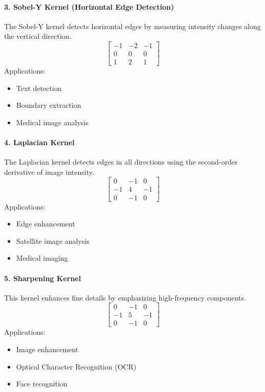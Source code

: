 \documentclass[11pt]{article}
\begin{document}
\vspace{3mm}
\paragraph{3. Sobel-Y Kernel (Horizontal Edge Detection)}
The Sobel-Y kernel detects horizontal edges by measuring intensity changes along the vertical direction.
\[
\begin{bmatrix} -1 & -2 & -1 \\ 0 & 0 & 0 \\ 1 & 2 & 1 \end{bmatrix}
\]
Applications:
\begin{itemize}
\item Text detection
\item Boundary extraction
\item Medical image analysis
\end{itemize}

\vspace{3mm}
\paragraph{4. Laplacian Kernel}
The Laplacian kernel detects edges in all directions using the second-order derivative of image intensity.
\[
\begin{bmatrix} 0 & -1 & 0 \\ -1 & 4 & -1 \\ 0 & -1 & 0 \end{bmatrix}
\]
Applications:
\begin{itemize}
\item Edge enhancement
\item Satellite image analysis
\item Medical imaging
\end{itemize}

\vspace{3mm}
\paragraph{5. Sharpening Kernel}
This kernel enhances fine details by emphasizing high-frequency components.
\[
\begin{bmatrix} 0 & -1 & 0 \\ -1 & 5 & -1 \\ 0 & -1 & 0 \end{bmatrix}
\]
Applications:
\begin{itemize}
\item Image enhancement
\item Optical Character Recognition (OCR)
\item Face recognition
\end{itemize}
\end{document}
